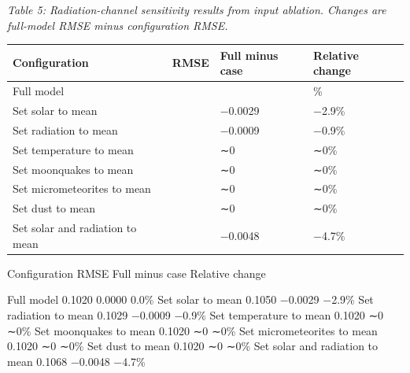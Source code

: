 \emph{Table 5: Radiation-channel sensitivity results from input ablation. Changes are full-model RMSE minus configuration RMSE.}

{\def\LTcaptype{none} %
\begin{longtable}[]{@{}
  >{\centering\arraybackslash}p{}
  >{\centering\arraybackslash}p{}
  >{\centering\arraybackslash}p{}
  >{\centering\arraybackslash}p{}@{}}
\toprule\noalign{}
\begin{minipage}[b]{\linewidth}\centering
\textbf{Configuration}
\end{minipage} & \begin{minipage}[b]{\linewidth}\centering
\textbf{RMSE}
\end{minipage} & \begin{minipage}[b]{\linewidth}\centering
\textbf{Full minus case}
\end{minipage} & \begin{minipage}[b]{\linewidth}\centering
\textbf{Relative change}
\end{minipage} \\
\midrule\noalign{}
\endhead
\bottomrule\noalign{}
\endlastfoot
Full model & 0.1020 & 0.0000 & 0.0\% \\
Set solar to mean & 0.1050 & −0.0029 & −2.9\% \\
Set radiation to mean & 0.1029 & −0.0009 & −0.9\% \\
Set temperature to mean & 0.1020 & ∼0 & ∼0\% \\
Set moonquakes to mean & 0.1020 & ∼0 & ∼0\% \\
Set micrometeorites to mean & 0.1020 & ∼0 & ∼0\% \\
Set dust to mean & 0.1020 & ∼0 & ∼0\% \\
Set solar and radiation to mean & 0.1068 & −0.0048 & −4.7\% \\
\end{longtable}
}

Configuration RMSE Full minus case Relative change

Full model 0.1020 0.0000 0.0\% Set solar to mean 0.1050 −0.0029 −2.9\% Set radiation to mean 0.1029 −0.0009 −0.9\% Set temperature to mean 0.1020 ∼0 ∼0\% Set moonquakes to mean 0.1020 ∼0 ∼0\% Set micrometeorites to mean 0.1020 ∼0 ∼0\% Set dust to mean 0.1020 ∼0 ∼0\% Set solar and radiation to mean 0.1068 −0.0048 −4.7\%

